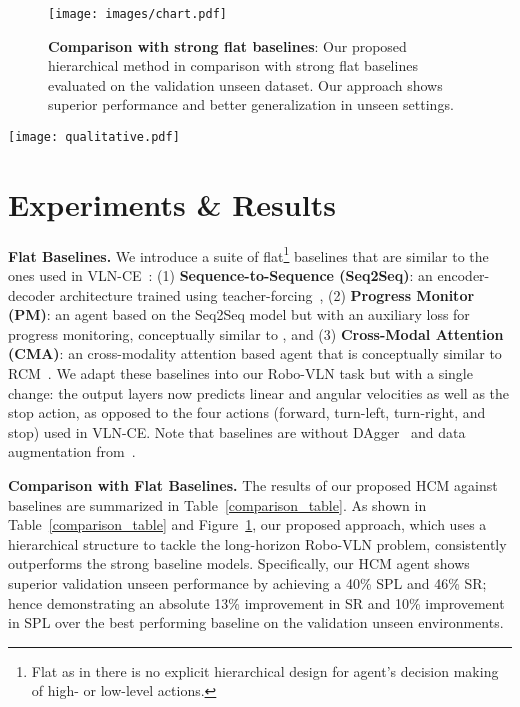 \documentclass[letter, 10pt, conference]{ieeeconf}
\begin{document}
\begin{figure}[!b]
\centering
\texttt{[image: images/chart.pdf]}
\centering
  \caption{\textbf{Comparison with strong flat baselines}: Our proposed hierarchical method in comparison with strong flat baselines evaluated on the validation unseen dataset. Our approach shows superior performance and better generalization in unseen settings.
  }
  \label{comparison}
\end{figure}

\begin{figure*}[htp]
\centering
\texttt{[image: qualitative.pdf]}
\label{qualitative}
\end{figure*}

\section{Experiments \& Results} \label{experiments}
\textbf{Flat Baselines.}\label{baselines}
We introduce a suite of flat\footnote{Flat as in there is no explicit hierarchical design for agent's decision making of high- or low-level actions.} baselines that are similar to the ones used in VLN-CE~\cite{krantz2020navgraph}:
(1) \textbf{Sequence-to-Sequence (Seq2Seq)}: an encoder-decoder architecture trained using teacher-forcing~\cite{mattersim},
(2) \textbf{Progress Monitor (PM)}: an agent based on the Seq2Seq model but with an auxiliary loss for progress monitoring, conceptually similar to \cite{ma2019selfmonitoring}, and 
(3) \textbf{Cross-Modal Attention (CMA)}: an cross-modality attention based agent that is conceptually similar to RCM~\cite{wang2019reinforced}.
We adapt these baselines into our Robo-VLN task but with a single change: the output layers now predicts linear and angular velocities as well as the stop action, as opposed to the four actions (forward, turn-left, turn-right, and stop) used in VLN-CE.
Note that baselines are without DAgger~\cite{ross2011reduction} and data augmentation from~\cite{tan2019learning}.

\textbf{Comparison with Flat Baselines.}
The results of our proposed HCM against baselines are summarized in Table~\ref{comparison_table}. As shown in Table~\ref{comparison_table} and Figure~\ref{comparison}, 
our proposed approach, which uses a hierarchical structure to tackle the long-horizon Robo-VLN problem, consistently outperforms the strong baseline models.  
Specifically, our HCM agent shows superior validation unseen performance by achieving a 40\% SPL and 46\% SR; hence demonstrating an absolute 13\% improvement in SR and 10\% improvement in SPL over the best performing baseline on the validation unseen environments.  
\end{document}
